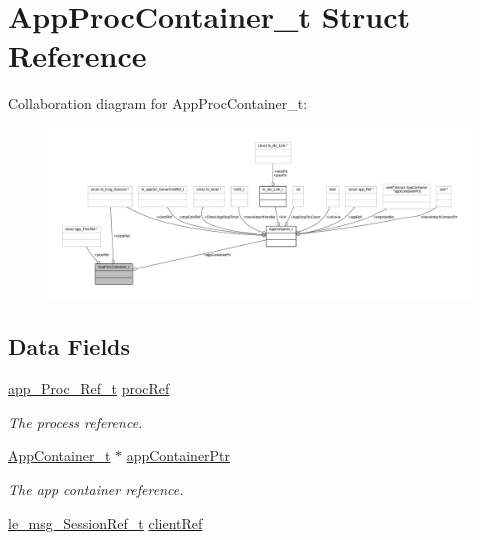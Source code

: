 \hypertarget{struct_app_proc_container__t}{}\section{App\+Proc\+Container\+\_\+t Struct Reference}
\label{struct_app_proc_container__t}


Collaboration diagram for App\+Proc\+Container\+\_\+t\+:
\nopagebreak
\begin{figure}[H]
\begin{center}
\leavevmode
\includegraphics[width=350pt]{struct_app_proc_container__t__coll__graph}
\end{center}
\end{figure}
\subsection*{Data Fields}
\begin{DoxyCompactItemize}
\item 
\hyperlink{daemons_2linux_2supervisor_2app_8h_a5a2d72506492a9e0f37d2081ff829bb3}{app\+\_\+\+Proc\+\_\+\+Ref\+\_\+t} \hyperlink{struct_app_proc_container__t_a8193c3b01f80cbfb0585ee192e08d82b}{proc\+Ref}
\begin{DoxyCompactList}\small\item\em The process reference. \end{DoxyCompactList}\item 
\hyperlink{struct_app_container__t}{App\+Container\+\_\+t} $\ast$ \hyperlink{struct_app_proc_container__t_a3aef8dbbccb8e4352912d04abd3c9aca}{app\+Container\+Ptr}
\begin{DoxyCompactList}\small\item\em The app container reference. \end{DoxyCompactList}\item 
\hyperlink{le__messaging_8h_aebfc01e15b430a5b4f3038a5bd518904}{le\+\_\+msg\+\_\+\+Session\+Ref\+\_\+t} \hyperlink{struct_app_proc_container__t_ae2431e4d6c88320d84a97381eefb1e92}{client\+Ref}
\end{DoxyCompactItemize}


